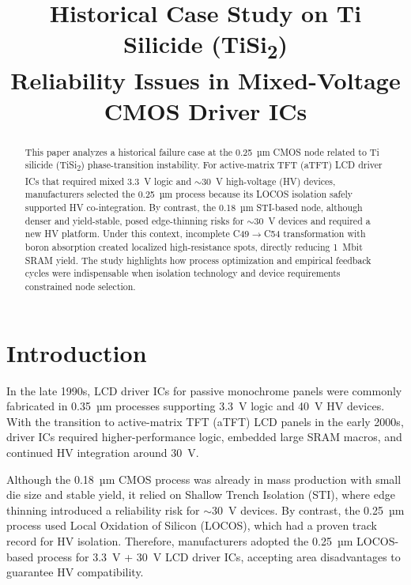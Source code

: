 \documentclass[conference]{IEEEtran}
\begin{document}
\title{Historical Case Study on Ti Silicide (TiSi\textsubscript{2}) \\ Reliability Issues in Mixed-Voltage CMOS Driver ICs}

\author{
}

\maketitle

\begin{abstract}
This paper analyzes a historical failure case at the 0.25~µm CMOS node related to Ti silicide (TiSi\textsubscript{2}) phase-transition instability.
For active-matrix TFT (aTFT) LCD driver ICs that required mixed 3.3~V logic and $\sim$30~V high-voltage (HV) devices, manufacturers selected the 0.25~µm process because its LOCOS isolation safely supported HV co-integration.
By contrast, the 0.18~µm STI-based node, although denser and yield-stable, posed edge-thinning risks for $\sim$30~V devices and required a new HV platform.
Under this context, incomplete C49$\rightarrow$C54 transformation with boron absorption created localized high-resistance spots, directly reducing 1~Mbit SRAM yield.
The study highlights how process optimization and empirical feedback cycles were indispensable when isolation technology and device requirements constrained node selection.
\end{abstract}

\section{Introduction}
In the late 1990s, LCD driver ICs for passive monochrome panels were commonly fabricated in 0.35~µm processes supporting 3.3~V logic and 40~V HV devices.
With the transition to active-matrix TFT (aTFT) LCD panels in the early 2000s, driver ICs required higher-performance logic, embedded large SRAM macros, and continued HV integration around 30~V.

Although the 0.18~µm CMOS process was already in mass production with small die size and stable yield, it relied on Shallow Trench Isolation (STI), where edge thinning introduced a reliability risk for $\sim$30~V devices.
By contrast, the 0.25~µm process used Local Oxidation of Silicon (LOCOS), which had a proven track record for HV isolation.
Therefore, manufacturers adopted the 0.25~µm LOCOS-based process for 3.3~V + 30~V LCD driver ICs, accepting area disadvantages to guarantee HV compatibility.
\end{document}
